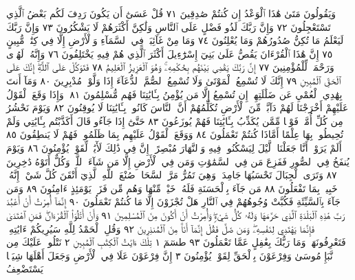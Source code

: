 وَيَقُولُونَ مَتَىٰ هَٰذَا ٱلْوَعْدُ إِن كُنتُمْ صَٰدِقِينَ ٧١ قُلْ عَسَىٰٓ
أَن يَكُونَ رَدِفَ لَكُم بَعْضُ ٱلَّذِي تَسْتَعْجِلُونَ ٧٢ وَإِنَّ رَبَّكَ
لَذُو فَضْلٍ عَلَى ٱلنَّاسِ وَلَٰكِنَّ أَكْثَرَهُمْ لَا يَشْكُرُونَ ٧٣ وَإِنَّ
رَبَّكَ لَيَعْلَمُ مَا تُكِنُّ صُدُورُهُمْ وَمَا يُعْلِنُونَ ٧٤ وَمَا مِنْ غَآئِبَةࣲ
فِي ٱلسَّمَآءِ وَٱلْأَرْضِ إِلَّا فِي كِتَٰبࣲ مُّبِينٍ ٧٥ إِنَّ هَٰذَا ٱلْقُرْءَانَ
يَقُصُّ عَلَىٰ بَنِيٓ إِسْرَٰٓءِيلَ أَكْثَرَ ٱلَّذِي هُمْ فِيهِ يَخْتَلِفُونَ ٧٦
وَإِنَّهُۥ لَهُدࣰى وَرَحْمَةࣱ لِّلْمُؤْمِنِينَ ٧٧ إِنَّ رَبَّكَ يَقْضِي بَيْنَهُم
بِحُكْمِهِۦۚ وَهُوَ ٱلْعَزِيزُ ٱلْعَلِيمُ ٧٨ فَتَوَكَّلْ عَلَى ٱللَّهِۖ إِنَّكَ عَلَى
ٱلْحَقِّ ٱلْمُبِينِ ٧٩ إِنَّكَ لَا تُسْمِعُ ٱلْمَوْتَىٰ وَلَا تُسْمِعُ ٱلصُّمَّ ٱلدُّعَآءَ
إِذَا وَلَّوْا۟ مُدْبِرِينَ ٨٠ وَمَآ أَنتَ بِهَٰدِي ٱلْعُمْيِ عَن ضَلَٰلَتِهِمْۖ إِن
تُسْمِعُ إِلَّا مَن يُؤْمِنُ بِـَٔايَٰتِنَا فَهُم مُّسْلِمُونَ ٨١۞ وَإِذَا وَقَعَ
ٱلْقَوْلُ عَلَيْهِمْ أَخْرَجْنَا لَهُمْ دَآبَّةࣰ مِّنَ ٱلْأَرْضِ تُكَلِّمُهُمْ أَنَّ
ٱلنَّاسَ كَانُوا۟ بِـَٔايَٰتِنَا لَا يُوقِنُونَ ٨٢ وَيَوْمَ نَحْشُرُ مِن كُلِّ أُمَّةࣲ
فَوْجࣰا مِّمَّن يُكَذِّبُ بِـَٔايَٰتِنَا فَهُمْ يُوزَعُونَ ٨٣ حَتَّىٰٓ إِذَا جَآءُو قَالَ
أَكَذَّبْتُم بِـَٔايَٰتِي وَلَمْ تُحِيطُوا۟ بِهَا عِلْمًا أَمَّاذَا كُنتُمْ تَعْمَلُونَ ٨٤
وَوَقَعَ ٱلْقَوْلُ عَلَيْهِم بِمَا ظَلَمُوا۟ فَهُمْ لَا يَنطِقُونَ ٨٥ أَلَمْ
يَرَوْا۟ أَنَّا جَعَلْنَا ٱلَّيْلَ لِيَسْكُنُوا۟ فِيهِ وَٱلنَّهَارَ مُبْصِرًاۚ إِنَّ فِي
ذَٰلِكَ لَأٓيَٰتࣲ لِّقَوْمࣲ يُؤْمِنُونَ ٨٦ وَيَوْمَ يُنفَخُ فِي ٱلصُّورِ فَفَزِعَ مَن
فِي ٱلسَّمَٰوَٰتِ وَمَن فِي ٱلْأَرْضِ إِلَّا مَن شَآءَ ٱللَّهُۚ وَكُلٌّ أَتَوْهُ
دَٰخِرِينَ ٨٧ وَتَرَى ٱلْجِبَالَ تَحْسَبُهَا جَامِدَةࣰ وَهِيَ تَمُرُّ مَرَّ ٱلسَّحَابِۚ
صُنْعَ ٱللَّهِ ٱلَّذِيٓ أَتْقَنَ كُلَّ شَيْءٍۚ إِنَّهُۥ خَبِيرُۢ بِمَا تَفْعَلُونَ ٨٨
مَن جَآءَ بِٱلْحَسَنَةِ فَلَهُۥ خَيْرࣱ مِّنْهَا وَهُم مِّن فَزَعࣲ يَوْمَئِذٍ ءَامِنُونَ ٨٩
وَمَن جَآءَ بِٱلسَّيِّئَةِ فَكُبَّتْ وُجُوهُهُمْ فِي ٱلنَّارِ هَلْ تُجْزَوْنَ إِلَّا
مَا كُنتُمْ تَعْمَلُونَ ٩٠ إِنَّمَآ أُمِرْتُ أَنْ أَعْبُدَ رَبَّ هَٰذِهِ ٱلْبَلْدَةِ ٱلَّذِي
حَرَّمَهَا وَلَهُۥ كُلُّ شَيْءࣲۖ وَأُمِرْتُ أَنْ أَكُونَ مِنَ ٱلْمُسْلِمِينَ ٩١
وَأَنْ أَتْلُوَا۟ ٱلْقُرْءَانَۖ فَمَنِ ٱهْتَدَىٰ فَإِنَّمَا يَهْتَدِي لِنَفْسِهِۦۖ
وَمَن ضَلَّ فَقُلْ إِنَّمَآ أَنَا۠ مِنَ ٱلْمُنذِرِينَ ٩٢ وَقُلِ ٱلْحَمْدُ لِلَّهِ
سَيُرِيكُمْ ءَايَٰتِهِۦ فَتَعْرِفُونَهَاۚ وَمَا رَبُّكَ بِغَٰفِلٍ عَمَّا تَعْمَلُونَ ٩٣
طسٓمٓ ١ تِلْكَ ءَايَٰتُ ٱلْكِتَٰبِ ٱلْمُبِينِ ٢ نَتْلُوا۟ عَلَيْكَ
مِن نَّبَإِ مُوسَىٰ وَفِرْعَوْنَ بِٱلْحَقِّ لِقَوْمࣲ يُؤْمِنُونَ ٣ إِنَّ
فِرْعَوْنَ عَلَا فِي ٱلْأَرْضِ وَجَعَلَ أَهْلَهَا شِيَعࣰا يَسْتَضْعِفُ
